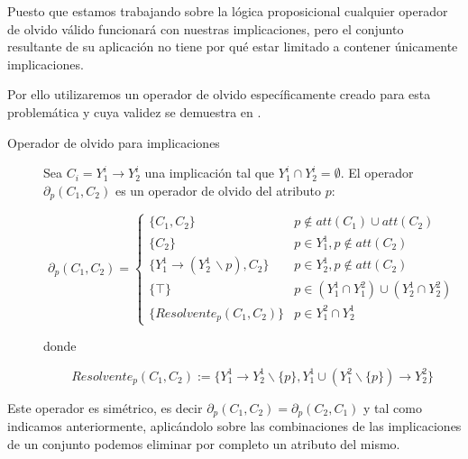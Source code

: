 Puesto que estamos trabajando sobre la lógica proposicional cualquier operador de olvido válido funcionará con nuestras implicaciones, pero el conjunto resultante de su aplicación no tiene por qué estar limitado a contener únicamente implicaciones. 

Por ello utilizaremos un operador de olvido específicamente creado para esta problemática y cuya validez se demuestra en .

\begin{description}
	\item[Operador de olvido para implicaciones] 
	Sea $C_i = Y_{1}^i \rightarrow Y_{2}^i$  una implicación tal que $Y_{1}^i \cap Y_{2}^i = \emptyset$. El operador $\partial_p (C_1, C_2)$ es un operador de olvido del atributo $p$:
	
	\begin{equation}
	\label{operadorOlvido}
	\partial_p (C_1, C_2) = 			
	\begin{cases} 
	\{C_1, C_2\} & p \notin att(C_1) \cup att(C_2) \\
	\{C_2\} &  p \in Y_1^1, p \notin att(C_2) \\
	\{Y_1^1 \rightarrow (Y_2^1 \, \backslash p) , C_2\} & p \in Y_2^1, p \notin att(C_2) \\
	\{ \top \} & p \in (Y_1^1 \cap Y_1^2) \cup (Y_2^1 \cap Y_2^2) \\
	\{Resolvente_p(C_1, C_2)\} & p \in Y_1^2 \cap Y_2^1
	\end{cases}
	\end{equation}
	
	donde 
	
	\[
	Resolvente_p(C_1, C_2) := \{Y_1^1 \rightarrow Y_2^1 \backslash \{p\}, Y_1^1 \cup (Y_1^2 \backslash \{p\}) \rightarrow Y_2^2 \}
	\]
	
\end{description}

Este operador es simétrico, es decir $\partial_p (C_1, C_2) = \partial_p (C_2, C_1)$ y tal como indicamos anteriormente, aplicándolo sobre las combinaciones de las implicaciones de un conjunto podemos eliminar por completo un atributo del mismo.



	

